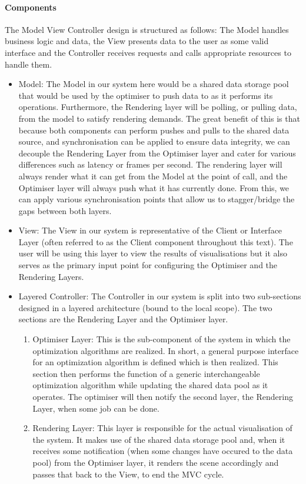 \documentclass[11pt]{article}
\begin{document}
\paragraph{Components}
The Model View Controller design is structured as follows: The Model handles business logic and data, the View presents data to the user as some valid interface and the Controller receives requests and calls appropriate resources to handle them.
\begin{itemize}
\item Model: The Model in our system here would be a shared data storage pool that would be used by the optimiser to push data to as it performs its operations. Furthermore, the Rendering layer will be polling, or pulling data, from the model to satisfy rendering demands. The great benefit of this is that because both components can perform pushes and pulls to the shared data source, and synchronisation can be applied to ensure data integrity, we can decouple the Rendering Layer from the Optimiser layer and cater for various differences such as latency or frames per second. The rendering layer will always render what it can get from the Model at the point of call, and the Optimiser layer will always push what it has currently done. From this, we can apply various synchronisation points that allow us to stagger/bridge the gaps between both layers.

\item View: The View in our system is representative of the Client or Interface Layer (often referred to as the Client component throughout this text). The user will be using this layer to view the results of visualisations but it also serves as the primary input point for configuring the Optimiser and the Rendering Layers.

\item Layered Controller: The Controller in our system is split into two sub-sections designed in a layered architecture (bound to the local scope). The two sections are the Rendering Layer and the Optimiser layer.
\begin{enumerate}
	\item Optimiser Layer: This is the sub-component of the system in which the optimization algorithms are realized. In short, a general purpose interface for an optimization algorithm is defined which is then realized. This section then performs the function of a generic interchangeable optimization algorithm while updating the shared data pool as it operates. The optimiser will then notify the second layer, the Rendering Layer, when some job can be done.
	\item Rendering Layer: This layer is responsible for the actual visualisation of the system. It makes use of the shared data storage pool and, when it receives some notification (when some changes have occured to the data pool) from the Optimiser layer, it renders the scene accordingly and passes that back to the View, to end the MVC cycle.
\end{enumerate}
\end{itemize}
\end{document}
